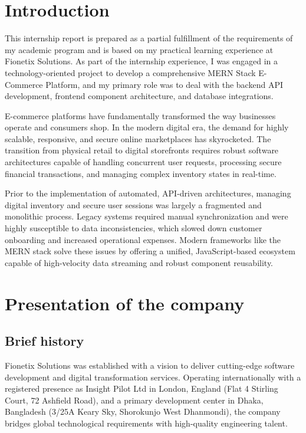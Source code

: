 \documentclass[12pt,a4paper]{report}
\begin{document}
\section{Introduction}
This internship report is prepared as a partial fulfillment of the requirements of my academic program and is based on my practical learning experience at Fionetix Solutions. As part of the internship experience, I was engaged in a technology-oriented project to develop a comprehensive MERN Stack E-Commerce Platform, and my primary role was to deal with the backend API development, frontend component architecture, and database integrations.

E-commerce platforms have fundamentally transformed the way businesses operate and consumers shop. In the modern digital era, the demand for highly scalable, responsive, and secure online marketplaces has skyrocketed. The transition from physical retail to digital storefronts requires robust software architectures capable of handling concurrent user requests, processing secure financial transactions, and managing complex inventory states in real-time.

Prior to the implementation of automated, API-driven architectures, managing digital inventory and secure user sessions was largely a fragmented and monolithic process. Legacy systems required manual synchronization and were highly susceptible to data inconsistencies, which slowed down customer onboarding and increased operational expenses. Modern frameworks like the MERN stack solve these issues by offering a unified, JavaScript-based ecosystem capable of high-velocity data streaming and robust component reusability.

\section{Presentation of the company}
\subsection{Brief history}
Fionetix Solutions was established with a vision to deliver cutting-edge software development and digital transformation services. Operating internationally with a registered presence as Insight Pilot Ltd in London, England (Flat 4 Stirling Court, 72 Ashfield Road), and a primary development center in Dhaka, Bangladesh (3/25A Keary Sky, Shorokunjo West Dhanmondi), the company bridges global technological requirements with high-quality engineering talent.
\end{document}
